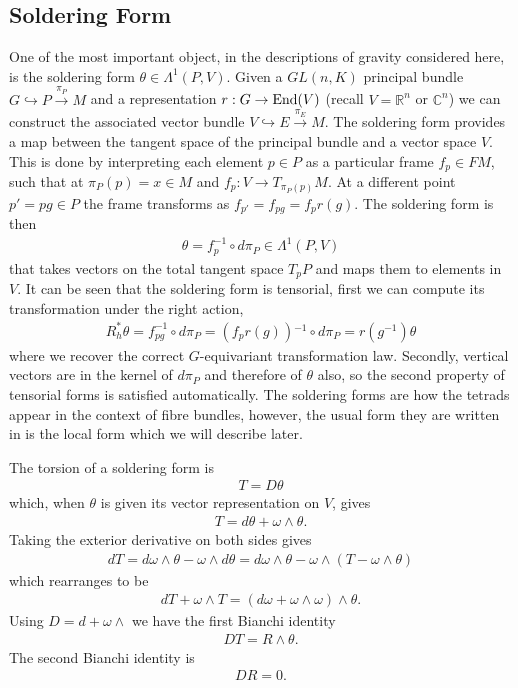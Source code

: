 \documentclass[10pt]{report}
\theoremstyle{definition}
\newcommand{\R}[0]{\mathbb{R}}
\newcommand{\C}[0]{\mathbb{C}}
\begin{document}
\subsection{Soldering Form}
One of the most important object, in the descriptions of gravity considered here, is the soldering form $\theta \in \Lambda^1(P,V)$. Given a $GL(n,K)$ principal bundle $G \hookrightarrow P \overset{\pi_P}{\rightarrow} M$ and a representation $r : G \rightarrow {\rm End}(V)$ (recall $V = \R^n$ or $\C^n$) we can construct the associated vector bundle $V \hookrightarrow E \overset{\pi_E}{\rightarrow} M$. The soldering form provides a map between the tangent space of the principal bundle and a vector space $V$. This is done by interpreting each element $p \in P$ as a particular frame $f_p \in FM$, such that at $\pi_P(p) = x \in M$ and $f_p : V \rightarrow T_{\pi_P(p)} M$. At a different point $p' =p g \in P$ the frame transforms as $f_{p'} = f_{p g} = f_p r(g)$. The soldering form is then
\begin{align}
    \theta = f_p^{-1} \circ d\pi_P \in \Lambda^1(P,V)
\end{align}
that takes vectors on the total tangent space $T_p P$ and maps them to elements in $V$. It can be seen that the soldering form is tensorial, first we can compute its transformation under the right action,
\begin{align}
    R_h^* \theta = f_{p g}^{-1} \circ d\pi_P = (f_p r(g)){}^{-1} \circ d\pi_P = r(g^{-1}) \theta
\end{align}
where we recover the correct $G$-equivariant transformation law. Secondly, vertical vectors are in the kernel of $d\pi_P$ and therefore of $\theta$ also, so the second property of tensorial forms is satisfied automatically. The soldering forms are how the tetrads appear in the context of fibre bundles, however, the usual form they are written in is the local form which we will describe later.

The torsion of a soldering form is 
\begin{align}
    T = D \theta
\end{align}
which, when $\theta$ is given its vector representation on $V$, gives
\begin{align}
    T = d \theta + \omega \wedge \theta.
\end{align}
Taking the exterior derivative on both sides gives 
\begin{align}
    dT = d \omega  \wedge \theta - \omega \wedge d \theta = d\omega \wedge \theta - \omega \wedge ( T - \omega \wedge \theta )
\end{align}
which rearranges to be 
\begin{align}
    dT + \omega \wedge T = (d\omega + \omega \wedge \omega) \wedge \theta.
\end{align}
Using $D = d + \omega \wedge$ we have the first Bianchi identity 
\begin{align}
    D T = R \wedge \theta.
\end{align}
The second Bianchi identity is 
\begin{align}
    D R = 0.
\end{align}
\end{document}
